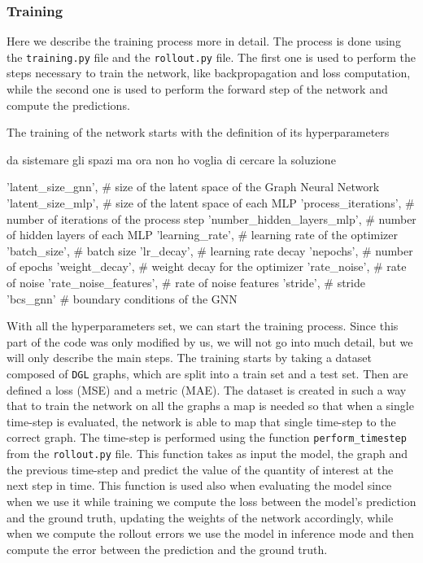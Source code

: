 \documentclass[11pt,a4paper]{article}
\begin{document}
\subsubsection*{Training}

Here we describe the training process more in detail. The process is done using the \texttt{training.py} file and the \texttt{rollout.py} file. The first one is used to perform the steps necessary to train the network, like backpropagation and loss computation, while the second one is used to perform the forward step of the network and compute the predictions.

The training of the network starts with the definition of its hyperparameters 



da sistemare gli spazi ma ora non ho voglia di cercare la soluzione
\begin{verbatim*}
{'latent_size_gnn', # size of the latent space of the Graph Neural Network 
'latent_size_mlp', # size of the latent space of each MLP
'process_iterations', # number of iterations of the process step
'number_hidden_layers_mlp', # number of hidden layers of each MLP
'learning_rate', # learning rate of the optimizer
'batch_size', # batch size
'lr_decay', # learning rate decay
'nepochs', # number of epochs
'weight_decay', # weight decay for the optimizer
'rate_noise', # rate of noise
'rate_noise_features', # rate of noise features
'stride', # stride
'bcs_gnn'} # boundary conditions of the GNN
\end{verbatim*}

With all the hyperparameters set, we can start the training process. Since this part of the code was only modified by us, we will not go into much detail, but we will only describe the main steps. The training starts by taking a dataset composed of \texttt{DGL} graphs, which are split into a train set and a test set. Then are defined a loss (MSE) and a metric (MAE). The dataset is created in such a way that to train the network on all the graphs a map is needed so that when a single time-step is evaluated, the network is able to map that single time-step to the correct graph. The time-step is performed using the function \texttt{perform\_timestep} from the \texttt{rollout.py} file. This function takes as input the model, the graph and the previous time-step and predict the value of the quantity of interest at the next step in time. This function is used also when evaluating the model since when we use it while training we compute the loss between the model's prediction and the ground truth, updating the weights of the network accordingly, while when we compute the rollout errors we use the model in inference mode and then compute the error between the prediction and the ground truth.
\end{document}
